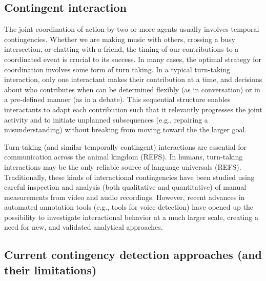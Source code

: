 \documentclass[10pt, letterpaper]{article}
\begin{document}
\hypertarget{contingent-interaction}{%
\subsection{Contingent interaction}\label{contingent-interaction}}

The joint coordination of action by two or more agents usually involves
temporal contingencies. Whether we are making music with others,
crossing a busy intersection, or chatting with a friend, the timing of
our contributions to a coordinated event is crucial to its success. In
many cases, the optimal strategy for coordination involves some form of
turn taking. In a typical turn-taking interaction, only one interactant
makes their contribution at a time, and decisions about who contributes
when can be determined flexibly (as in conversation) or in a pre-defined
manner (as in a debate). This sequential structure enables interactants
to adapt each contribution such that it relevantly progresses the joint
activity and to initiate unplanned subsequences (e.g., repairing a
misunderstanding) without breaking from moving toward the the larger
goal.

Turn-taking (and similar temporally contingent) interactions are
essential for communication across the animal kingdom (REFS). In humans,
turn-taking interactions may be the only reliable source of language
universals (REFS). Traditionally, these kinds of interactional
contingencies have been studied using careful inspection and analysis
(both qualitative and quantitative) of manual measurements from video
and audio recordings. However, recent advances in automated annotation
tools (e.g., tools for voice detection) have opened up the possibility
to investigate interactional behavior at a much larger scale, creating a
need for new, and validated analytical approaches.

\hypertarget{current-contingency-detection-approaches-and-their-limitations}{%
\subsection{Current contingency detection approaches (and their
limitations)}\label{current-contingency-detection-approaches-and-their-limitations}}
\end{document}
